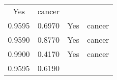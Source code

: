\documentclass[12pt,]{article}
\begin{document}
\begin{longtable}[]{@{}cccc@{}}
\begin{minipage}[t]{0.22\columnwidth}
Yes\strut
\end{minipage} & \begin{minipage}[t]{0.16\columnwidth}\centering\strut
cancer\strut
\end{minipage}\tabularnewline
\begin{minipage}[t]{0.24\columnwidth}\centering\strut
0.9595\strut
\end{minipage} & \begin{minipage}[t]{0.26\columnwidth}\centering\strut
0.6970\strut
\end{minipage} & \begin{minipage}[t]{0.22\columnwidth}\centering\strut
Yes\strut
\end{minipage} & \begin{minipage}[t]{0.16\columnwidth}\centering\strut
cancer\strut
\end{minipage}\tabularnewline
\begin{minipage}[t]{0.24\columnwidth}\centering\strut
0.9590\strut
\end{minipage} & \begin{minipage}[t]{0.26\columnwidth}\centering\strut
0.8770\strut
\end{minipage} & \begin{minipage}[t]{0.22\columnwidth}\centering\strut
Yes\strut
\end{minipage} & \begin{minipage}[t]{0.16\columnwidth}\centering\strut
cancer\strut
\end{minipage}\tabularnewline
\begin{minipage}[t]{0.24\columnwidth}\centering\strut
0.9900\strut
\end{minipage} & \begin{minipage}[t]{0.26\columnwidth}\centering\strut
0.4170\strut
\end{minipage} & \begin{minipage}[t]{0.22\columnwidth}\centering\strut
Yes\strut
\end{minipage} & \begin{minipage}[t]{0.16\columnwidth}\centering\strut
cancer\strut
\end{minipage}\tabularnewline
\begin{minipage}[t]{0.24\columnwidth}\centering\strut
0.9595\strut
\end{minipage} & \begin{minipage}[t]{0.26\columnwidth}\centering\strut
0.6190\strut
\end{minipage} & \begin{minipage}[t]{0.22\columnwidth}\centering\strut

\end{minipage}
\end{longtable}
\end{document}
